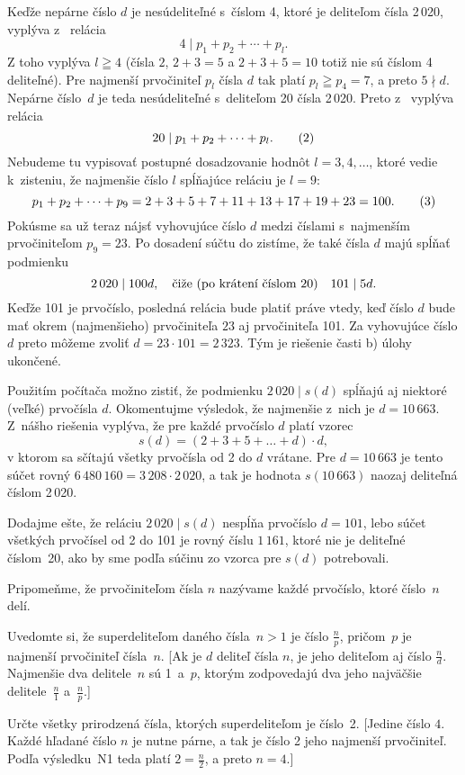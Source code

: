 {Keďže nepárne číslo $d$ je nesúdeliteľné s~číslom 4,
ktoré je deliteľom čísla 2\,020, vyplýva z~ relácia
$$
4\mid p_1+p_2+\cdots+p_l.
$$
Z toho vyplýva $l\geqq4$ (čísla $2$, $2+3=5$ a $2+3+5=10$ totiž
nie sú číslom 4 deliteľné). Pre najmenší prvočiniteľ $p_l$ čísla $d$
tak platí $p_l\geqq p_4=7$, a preto $5\nmid d$. Nepárne číslo~$d$ je
teda nesúdeliteľné s~deliteľom 20 čísla 2\,020. Preto z~ vyplýva relácia
$$
20\mid p_1+p_2+\cdots+p_l.
\tag2
$$
Nebudeme tu vypisovať postupné dosadzovanie hodnôt $l=3,4,\dots$,
ktoré vedie k~zisteniu, že najmenšie číslo $l$ spĺňajúce reláciu  je
$l=9$:
$$
p_1+p_2+\cdots+p_9=2+3+5+7+11+13+17+19+23=100.
\tag3
$$
Pokúsme sa už teraz nájsť vyhovujúce číslo $d$ medzi číslami
s~najmenším prvočiniteľom $p_9=23$. Po dosadení súčtu
 do  zistíme, že také čísla $d$ majú spĺňať podmienku
$$
2\,020\mid 100d,\quad\hbox{čiže (po krátení číslom 20)}\quad 101\mid 5d.
$$
Keďže 101 je prvočíslo, posledná relácia bude platiť
práve vtedy, keď číslo $d$ bude mať okrem (najmenšieho) prvočiniteľa $23$
aj prvočiniteľa 101. Za vyhovujúce číslo $d$ preto môžeme
zvoliť $d=23\cdot101=2\,323$. Tým je riešenie časti b) úlohy
ukončené.

\poznamka
Použitím počítača možno zistiť, že podmienku
$2\,020\mid s(d)$ spĺňajú aj niektoré (veľké) prvočísla $d$.
Okomentujme výsledok, že najmenšie z~nich je $d=10\,663$.
Z~nášho riešenia vyplýva, že pre každé prvočíslo $d$ platí vzorec
$$
s(d) = (2+3+5+\dots+d)\cdot d,
$$
v ktorom sa sčítajú všetky prvočísla od 2 do $d$ vrátane.
Pre $d=10\,663$ je tento súčet rovný
$6\,480\,160=3\,208\cdot2\,020$, a tak je hodnota
$s(10\,663)$ naozaj deliteľná číslom 2\,020.

Dodajme ešte, že reláciu
$2\,020\mid s(d)$ nespĺňa  prvočíslo $d=101$,
lebo súčet všetkých prvočísel od 2 do 101 je rovný číslu $1\,161$,
ktoré nie je deliteľné číslom~20, ako by sme podľa súčinu zo
vzorca pre $s(d)$ potrebovali.

\titem
Pripomeňme, že prvočiniteľom čísla $n$ nazývame každé
prvočíslo, ktoré číslo~$n$ delí.

Uvedomte si, že superdeliteľom daného čísla~$n>1$ je číslo $\frac np$,
pričom~$p$ je najmenší prvočiniteľ čísla~$n$.
[Ak je $d$ deliteľ čísla $n$, je jeho deliteľom aj číslo
$\frac nd$. Najmenšie dva delitele~$n$ sú 1~a~$p$, ktorým zodpovedajú
dva jeho najväčšie delitele~$\frac n1$ a~$\frac np$.]

Určte všetky prirodzená čísla, ktorých superdeliteľom je číslo~2.
[Jedine číslo $4$. Každé hľadané číslo $n$ je nutne párne, a tak
je číslo 2 jeho najmenší prvočiniteľ. Podľa výsledku~N1 teda
platí $2=\frac n2$, a preto $n=4$.]


}
